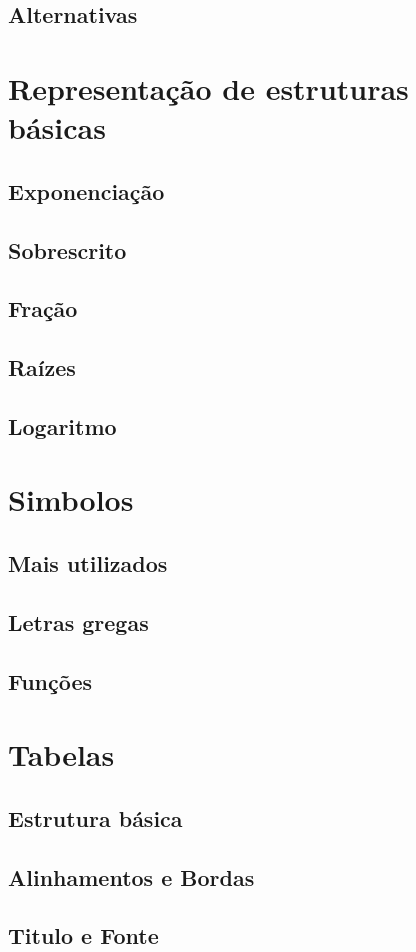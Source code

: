 \documentclass[12pt,a4paper]{article}
\begin{document}
\subsection{Alternativas}


\section{Representação de estruturas básicas}
\subsection{Exponenciação}
\subsection{Sobrescrito}
\subsection{Fração}
\subsection{Raízes}
\subsection{Logaritmo}

\section{Simbolos}
\subsection{Mais utilizados}
\subsection{Letras gregas}
\subsection{Funções}

\section{Tabelas}
\subsection{Estrutura básica}
\subsection{Alinhamentos e Bordas}
\subsection{Titulo e Fonte}

	
\end{document}
